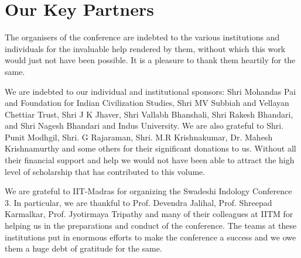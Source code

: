 
\chapter*{Our Key Partners}

The organisers of the conference are indebted to the various institutions and individuals for the invaluable help rendered by them, without which this work would just not have been possible. It is a pleasure to thank them heartily for the same.

We are indebted to our individual and institutional sponsors: Shri Mohandas Pai and Foundation for Indian Civilization Studies, Shri MV Subbiah and Vellayan Chettiar Trust, Shri J K Jhaver, Shri Vallabh Bhanshali, Shri Rakesh Bhandari, and Shri Nagesh Bhandari and Indus University. We are also grateful to Shri. Punit Modhgil, Shri. G Rajaraman, Shri. M.R Krishnakumar, Dr. Mahesh Krishnamurthy and some others for their significant donations to us. Without all their financial support and help we would not have been able to attract the high level of scholarship that has contributed to this volume.

We are grateful to IIT-Madras for organizing the Swadeshi Indology Conference 3. In particular, we are thankful to Prof. Devendra Jalihal, Prof. Shreepad Karmalkar, Prof. Jyotirmaya Tripathy and many of their colleagues at IITM for helping us in the preparations and conduct of the conference. The teams at these institutions put in enormous efforts to make the conference a success and we owe them a huge debt of gratitude for the same.

